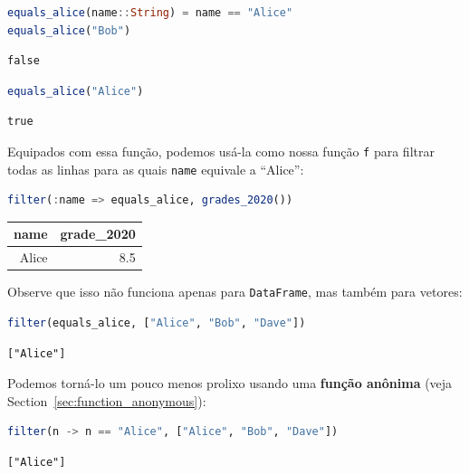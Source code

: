 \documentclass[
  notoc %
]{tufte-book}
\newcommand{\passthrough}[1]{#1}
\begin{document}
\begin{lstlisting}[language=Julia]
equals_alice(name::String) = name == "Alice"
equals_alice("Bob")
\end{lstlisting}

\begin{lstlisting}[language=Output]
false
\end{lstlisting}

\begin{lstlisting}[language=Julia]
equals_alice("Alice")
\end{lstlisting}

\begin{lstlisting}[language=Output]
true
\end{lstlisting}

Equipados com essa função, podemos usá-la como nossa função
\passthrough{\lstinline!f!} para filtrar todas as linhas para as quais
\passthrough{\lstinline!name!} equivale a ``Alice'':

\begin{lstlisting}[language=Julia]
filter(:name => equals_alice, grades_2020())
\end{lstlisting}

\begin{longtable}[]{@{}rr@{}}
\toprule
name & grade\_2020 \\
\midrule
\endhead
Alice & 8.5 \\
\bottomrule
\end{longtable}

Observe que isso não funciona apenas para
\passthrough{\lstinline!DataFrame!}, mas também para vetores:

\begin{lstlisting}[language=Julia]
filter(equals_alice, ["Alice", "Bob", "Dave"])
\end{lstlisting}

\begin{lstlisting}[language=Output]
["Alice"]
\end{lstlisting}

Podemos torná-lo um pouco menos prolixo usando uma \textbf{função
anônima} (veja Section~\ref{sec:function_anonymous}):

\begin{lstlisting}[language=Julia]
filter(n -> n == "Alice", ["Alice", "Bob", "Dave"])
\end{lstlisting}

\begin{lstlisting}[language=Output]
["Alice"]
\end{lstlisting}
\end{document}

